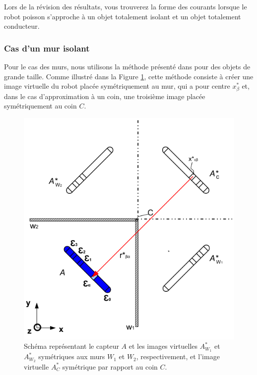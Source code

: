 Lors de la révision des résultats, vous trouverez la forme des courants lorsque le robot poisson s'approche à un objet totalement isolant et un objet totalement conducteur. 

\subsubsection{Cas d'un mur isolant}

Pour le cas des murs, nous utilisons la méthode présenté dans \cite{Jackson2012} pour des objets de grande taille. Comme illustré dans la Figure \ref{fig:schema_murs_coins}, cette méthode consiste à créer une image virtuelle du robot placée symétriquement au mur, qui a pour centre $x_\beta^*$ et, dans le cas d'approximation à un coin, une troisième image placée symétriquement au coin $C$. 

\begin{figure}[h!]
    \centering
    \includegraphics[scale=0.5]{doc/img/schema_murs_coins.png}
    \caption{\centering Schéma représentant le capteur $A$ et les images virtuelles $A_{W_1}^*$ et $A_{W_2}^*$ symétriques aux murs $W_{1}$ et $W_{2}$, respectivement, et l'image virtuelle $A_C^*$ symétrique par rapport au coin $C$. }
    \label{fig:schema_murs_coins}
\end{figure}

